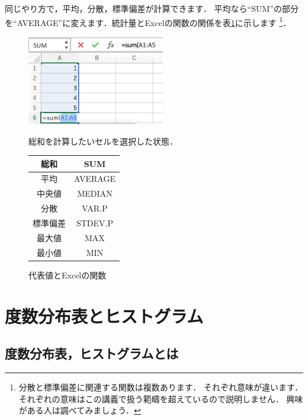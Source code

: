 同じやり方で，平均，分散，標準偏差が計算できます．
平均なら``SUM''の部分を``AVERAGE''に変えます．統計量とExcelの関数の関係を表\ref{tab:funcs}に示します
\footnote{分散と標準偏差に関連する関数は複数あります．
  それぞれ意味が違います．
  それぞれの意味はこの講義で扱う範疇を超えているので説明しません．
  興味がある人は調べてみましょう．}．

\begin{figure}[htbp]
    \begin{minipage}{0.5\hsize}
        \centering
        \includegraphics[width=6cm]{chap1/sum.png}
        \caption{総和を計算したいセルを選択した状態．}
        \label{fig:sum}
    \end{minipage}
    \begin{minipage}{0.5\hsize}
        \centering
        \makeatletter
        \def\@captype{table}
        \makeatother
        \caption{代表値とExcelの関数}
        \begin{tabular}{|c|c|}
          \hline
          総和     & SUM\\ \hline
          平均     & AVERAGE\\ \hline
          中央値   & MEDIAN \\ \hline
          分散     & VAR.P\\ \hline
          標準偏差 & STDEV.P \\ \hline
          最大値   & MAX \\ \hline
          最小値   & MIN \\ \hline
        \end{tabular}
        \label{tab:funcs}
    \end{minipage}
\end{figure}

\section{度数分布表とヒストグラム}

\subsection{度数分布表，ヒストグラムとは}

